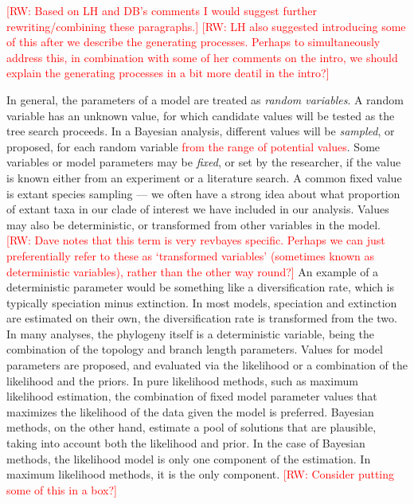 \documentclass[11pt]{article}
\newcommand{\rw}[1]{{\textcolor{red}{[RW: #1]}}} %
\newcommand{\edit}[1]{{\textcolor{red}{#1}}} %
\begin{document}
\rw{Based on LH and DB's comments I would suggest further rewriting/combining these paragraphs.}
\rw{LH also suggested introducing some of this after we describe the generating processes. Perhaps to simultaneously address this, in combination with some of her comments on the intro, we should explain the generating processes in a bit more deatil in the intro?}

In general, the parameters of a model are treated as \textit{random variables}.
A random variable has an unknown value, for which candidate values will be tested as the tree search proceeds. 
In a Bayesian analysis, different values will be \textit{sampled}, or proposed, for each random variable \edit{from the range of potential values}.
Some variables or model parameters may be \textit{fixed}, or set by the researcher, if the value is known either from an experiment or a literature search.
A common fixed value is extant species sampling --- we often have a strong idea about what proportion of extant taxa in our clade of interest we have included in our analysis.
Values may also be deterministic, or transformed from other variables in the model. \rw{Dave notes that this term is very revbayes specific. Perhaps we can just preferentially refer to these as `transformed variables' (sometimes known as deterministic variables), rather than the other way round?}
An example of a deterministic parameter would be something like a diversification rate, which is typically speciation minus extinction.
In most models, speciation and extinction are estimated on their own, the diversification rate is transformed from the two.
In many analyses, the phylogeny itself is a deterministic variable, being the combination of the topology and branch length parameters.
Values for model parameters are proposed, and evaluated via the likelihood or a combination of the likelihood and the priors.  
In pure likelihood methods, such as maximum likelihood estimation, the combination of fixed model parameter values that maximizes the likelihood of the data given the model is preferred.
Bayesian methods, on the other hand, estimate a pool of solutions that are plausible, taking into account both the likelihood and prior.
In the case of Bayesian methods, the likelihood model is only one component of the estimation.
In maximum likelihood methods, it is the only component. \rw{Consider putting some of this in a box?}
\end{document}
